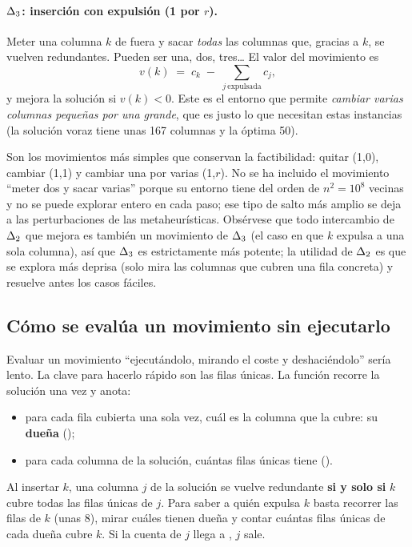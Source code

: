 \paragraph{$\Delta_{3}$: inserción con expulsión (1 por $r$).} Meter una columna $k$ de fuera y
sacar \emph{todas} las columnas que, gracias a $k$, se vuelven redundantes. Pueden ser una,
dos, tres\ldots{} El valor del movimiento es
\[
  v(k) \;=\; c_k \;-\; \sum_{j\ \text{expulsada}} c_j ,
\]
y mejora la solución si $v(k)<0$. Este es el entorno que permite \emph{cambiar varias
columnas pequeñas por una grande}, que es justo lo que necesitan estas instancias (la
solución voraz tiene unas 167 columnas y la óptima 50).

\begin{decision}
Son los movimientos más simples que conservan la factibilidad: quitar (1,0), cambiar (1,1) y
cambiar una por varias (1,$r$). No se ha incluido el movimiento ``meter dos y sacar varias''
porque su entorno tiene del orden de $n^2 = 10^8$ vecinas y no se puede explorar entero en
cada paso; ese tipo de salto más amplio se deja a las perturbaciones de las metaheurísticas.
Obsérvese que todo intercambio de $\Delta_{2}$ que mejora es también un movimiento de $\Delta_{3}$ (el
caso en que $k$ expulsa a una sola columna), así que $\Delta_{3}$ es estrictamente más potente; la
utilidad de $\Delta_{2}$ es que se explora más deprisa (solo mira las columnas que cubren una
fila concreta) y resuelve antes los casos fáciles.
\end{decision}

\subsection{Cómo se evalúa un movimiento sin ejecutarlo}

Evaluar un movimiento ``ejecutándolo, mirando el coste y deshaciéndolo'' sería lento. La
clave para hacerlo rápido son las filas únicas. La función  recorre la
solución una vez y anota:
\begin{itemize}
  \item para cada fila cubierta una sola vez, cuál es la columna que la cubre: su
        \textbf{dueña} ();
  \item para cada columna de la solución, cuántas filas únicas tiene ().
\end{itemize}

\begin{idea}
Al insertar $k$, una columna $j$ de la solución se vuelve redundante \textbf{si y solo si}
$k$ cubre todas las filas únicas de $j$. Para saber a quién expulsa $k$ basta recorrer las
filas de $k$ (unas 8), mirar cuáles tienen dueña y contar cuántas filas únicas de cada dueña
cubre $k$. Si la cuenta de $j$ llega a , $j$ sale.
\end{idea}

